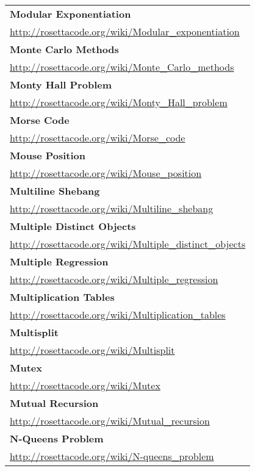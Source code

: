 \begin{longtable}{l}
\textbf{Modular Exponentiation } \\ \href{http://rosettacode.org/wiki/Modular\_exponentiation}{http://rosettacode.org/wiki/Modular\_exponentiation} \\
\textbf{Monte Carlo Methods } \\ \href{http://rosettacode.org/wiki/Monte\_Carlo\_methods}{http://rosettacode.org/wiki/Monte\_Carlo\_methods} \\
\textbf{
Monty Hall Problem } \\ \href{http://rosettacode.org/wiki/Monty\_Hall\_problem}{http://rosettacode.org/wiki/Monty\_Hall\_problem} \\
\textbf{Morse Code } \\ \href{http://rosettacode.org/wiki/Morse\_code}{http://rosettacode.org/wiki/Morse\_code} \\
\textbf{Mouse Position } \\ \href{http://rosettacode.org/wiki/Mouse\_position}{http://rosettacode.org/wiki/Mouse\_position} \\
\textbf{Multiline Shebang } \\ \href{http://rosettacode.org/wiki/Multiline\_shebang}{http://rosettacode.org/wiki/Multiline\_shebang} \\
\textbf{
Multiple Distinct Objects } \\ \href{http://rosettacode.org/wiki/Multiple\_distinct\_objects}{http://rosettacode.org/wiki/Multiple\_distinct\_objects} \\
\textbf{Multiple Regression } \\ \href{http://rosettacode.org/wiki/Multiple\_regression}{http://rosettacode.org/wiki/Multiple\_regression} \\
\textbf{
Multiplication Tables } \\ \href{http://rosettacode.org/wiki/Multiplication\_tables}{http://rosettacode.org/wiki/Multiplication\_tables} \\
\textbf{Multisplit } \\ \href{http://rosettacode.org/wiki/Multisplit}{http://rosettacode.org/wiki/Multisplit} \\
\textbf{Mutex } \\ \href{http://rosettacode.org/wiki/Mutex}{http://rosettacode.org/wiki/Mutex} \\
\textbf{Mutual Recursion } \\ \href{http://rosettacode.org/wiki/Mutual\_recursion}{http://rosettacode.org/wiki/Mutual\_recursion} \\
\textbf{
N-Queens Problem } \\ \href{http://rosettacode.org/wiki/N-queens\_problem}{http://rosettacode.org/wiki/N-queens\_problem} \\

\end{longtable}
